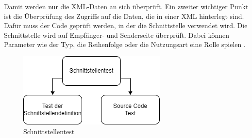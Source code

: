 Damit werden nur die XML-Daten an sich überprüft. Ein zweiter wichtiger Punkt ist die Überprüfung des Zugriffs auf die Daten, die in einer XML hinterlegt sind.
Dafür muss der Code geprüft werden, in der die Schnittstelle verwendet wird.
Die Schnittstelle wird auf Empfänger- und Senderseite überprüft. Dabei können Parameter wie der Typ, die Reihenfolge oder die Nutzungsart eine Rolle spielen \parencite[S. 228]{integration}.\par
\begin{figure}[!h]
\centering
\includegraphics[scale=.9,]{Bilder/Quicktest/Schnittstellen.drawio.png}
\caption{Schnittstellentest \parencite[S. 226]{integration}}
\end{figure}



















